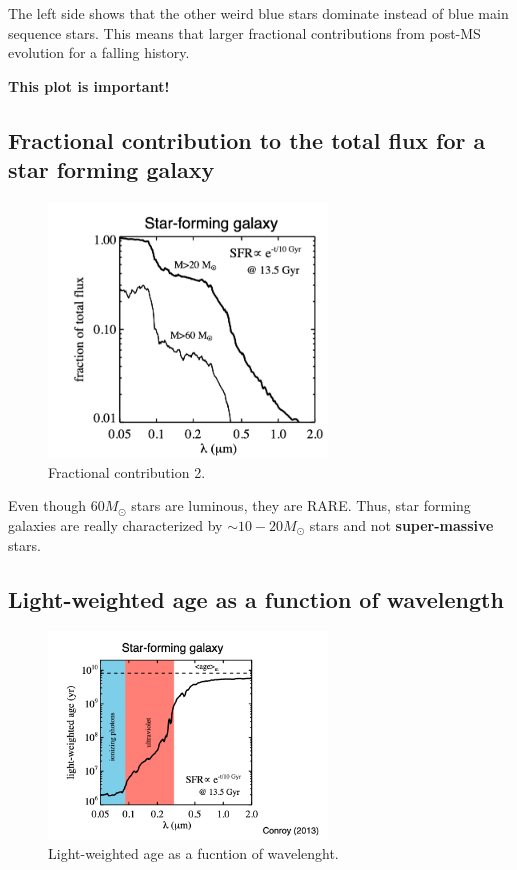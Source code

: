 \documentclass{article}
\begin{document}
The left side shows that the other weird blue stars dominate instead of blue main sequence stars. This means that larger fractional contributions from post-MS evolution for a falling history. 

\textbf{This plot is important!}

\subsection{Fractional contribution to the total flux for a star forming galaxy}

\begin{figure}
    \centering
    \includegraphics[width=0.66\textwidth]{figs/Screen Shot 2021-09-24 at 9.32.53 AM.png}
    \caption{Fractional contribution 2.}
    \label{fig:frac2}
\end{figure}

Even though $60 M_\odot$ stars are luminous, they are RARE. Thus, star forming galaxies are really characterized by $\sim 10-20 M_\odot$ stars and not \textbf{super-massive} stars. 

\subsection{Light-weighted age as a function of wavelength}

\begin{figure}
    \centering
    \includegraphics[width=0.66\textwidth]{figs/Screen Shot 2021-09-24 at 9.33.28 AM.png}
    \caption{Light-weighted age as a fucntion of wavelenght.}
    \label{fig:lam_age}
\end{figure}
\end{document}
